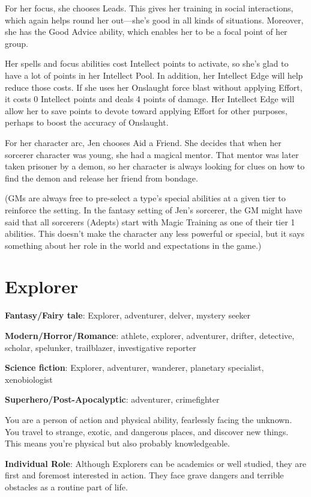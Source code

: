 For her focus, she chooses Leads. This gives her training in social interactions, which again helps round her out—she’s good in all kinds of situations. Moreover, she has the Good Advice ability, which enables her to be a focal point of her group.

Her spells and focus abilities cost Intellect points to activate, so she’s glad to have a lot of points in her Intellect Pool. In addition, her Intellect Edge will help reduce those costs. If she uses her Onslaught force blast without applying Effort, it costs 0 Intellect points and deals 4 points of damage. Her Intellect Edge will allow her to save points to devote toward applying Effort for other purposes, perhaps to boost the accuracy of Onslaught.

For her character arc, Jen chooses Aid a Friend. She decides that when her sorcerer character was young, she had a magical mentor. That mentor was later taken prisoner by a demon, so her character is always looking for clues on how to find the demon and release her friend from bondage.

(GMs are always free to pre-select a type’s special abilities at a given tier to reinforce the setting. In the fantasy setting of Jen’s sorcerer, the GM might have said that all sorcerers (Adepts) start with Magic Training as one of their tier 1 abilities. This doesn’t make the character any less powerful or special, but it says something about her role in the world and expectations in the game.)

\section{Explorer}

\textbf{Fantasy/Fairy tale}: Explorer, adventurer, delver, mystery seeker

\textbf{Modern/Horror/Romance}: athlete, explorer, adventurer, drifter, detective, scholar, spelunker, trailblazer, investigative reporter

\textbf{Science fiction}: Explorer, adventurer, wanderer, planetary specialist, xenobiologist

\textbf{Superhero/Post-Apocalyptic}: adventurer, crimefighter

You are a person of action and physical ability, fearlessly facing the unknown. You travel to strange, exotic, and dangerous places, and discover new things. This means you’re physical but also probably knowledgeable.

\textbf{Individual Role}: Although Explorers can be academics or well studied, they are first and foremost interested in action. They face grave dangers and terrible obstacles as a routine part of life. 

